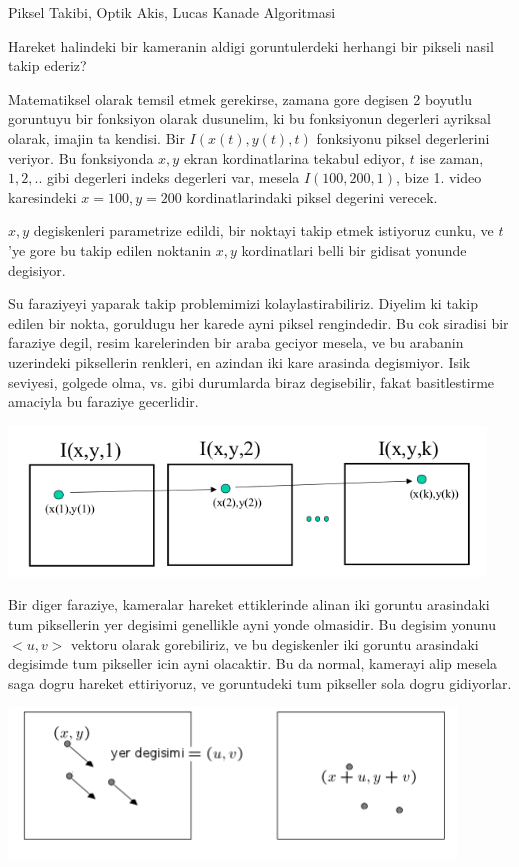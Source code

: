 \documentclass[12pt,fleqn]{article}\usepackage{../common}
\begin{document}
Piksel Takibi, Optik Akis, Lucas Kanade Algoritmasi

Hareket halindeki bir kameranin aldigi goruntulerdeki herhangi bir pikseli
nasil takip ederiz? 

Matematiksel olarak temsil etmek gerekirse, zamana gore degisen 2 boyutlu
goruntuyu bir fonksiyon olarak dusunelim, ki bu fonksiyonun degerleri
ayriksal olarak, imajin ta kendisi. Bir $I(x(t),y(t),t)$ fonksiyonu piksel
degerlerini veriyor. Bu fonksiyonda $x,y$ ekran kordinatlarina tekabul
ediyor, $t$ ise zaman, $1,2,..$ gibi degerleri indeks degerleri var, mesela
$I(100,200,1)$, bize 1. video karesindeki $x=100,y=200$ kordinatlarindaki
piksel degerini verecek.

$x,y$ degiskenleri parametrize edildi, bir noktayi takip etmek istiyoruz
cunku, ve $t$'ye gore bu takip edilen noktanin $x,y$ kordinatlari belli bir
gidisat yonunde degisiyor.

Su faraziyeyi yaparak takip problemimizi kolaylastirabiliriz. Diyelim ki
takip edilen bir nokta, goruldugu her karede ayni piksel rengindedir. Bu
cok siradisi bir faraziye degil, resim karelerinden bir araba geciyor
mesela, ve bu arabanin uzerindeki piksellerin renkleri, en azindan iki kare
arasinda degismiyor. Isik seviyesi, golgede olma, vs. gibi durumlarda biraz
degisebilir, fakat basitlestirme amaciyla bu faraziye gecerlidir. 

\includegraphics[height=4cm]{disp2.png}

Bir diger faraziye, kameralar hareket ettiklerinde alinan iki goruntu
arasindaki tum piksellerin yer degisimi genellikle ayni yonde olmasidir. Bu
degisim yonunu $<u,v>$ vektoru olarak gorebiliriz, ve bu degiskenler iki
goruntu arasindaki degisimde tum pikseller icin ayni olacaktir. Bu da
normal, kamerayi alip mesela saga dogru hareket ettiriyoruz, ve goruntudeki
tum pikseller sola dogru gidiyorlar.

\includegraphics[height=4cm]{disp1.png}
\end{document}
